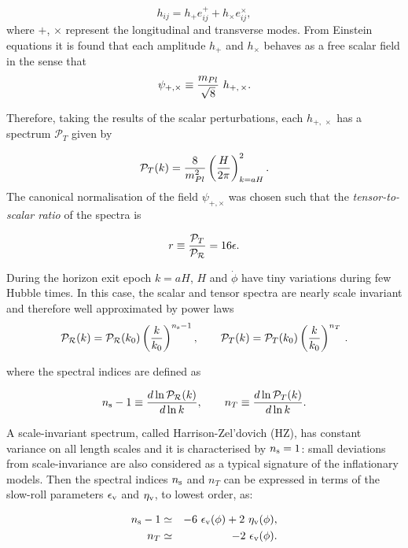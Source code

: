 \documentclass{rmaa}
\def\beq{\begin{equation}}
\def\eeq{\end{equation}}
\def\bea{\begin{eqnarray}}
\def\eea{\end{eqnarray}}
\def\cal{\mathcal}
\begin{document}
\beq
h_{ij}= h_{+}\mathit{e}^{+}_{ij}+h_{\times}\mathit{e}^{\times}_{ij},
\eeq
%
where $+$, $\times$ represent the longitudinal and transverse modes.
From Einstein equations it is found that each amplitude $h_{+}$ and $h_{\times}$
behaves as a free scalar field in the sense that
\beq
\psi_{+,\times}\equiv {m_{Pl} \over \sqrt 8}\,\,h_{+,\, \times}.
\eeq 

\noindent
Therefore, taking the results of the scalar perturbations, each $h_{+,\, \times}$ has a spectrum $\cal P_T$ given by

\beq
\cal P_{T}(k)={8 \over m_{Pl}^2} \left({H \over 2\pi} \right)_{k=aH}^2.
\eeq
%
The canonical normalisation of the field $\psi_{+,\times}$ was chosen such that
the \textit{tensor-to-scalar ratio} of the spectra is  

\begin{equation}
r \equiv {\cal P_{T} \over \cal P_{\cal R}} =16 \epsilon .
\end{equation}

During the horizon exit epoch $k=aH$, $H$ and $\dot \phi$ have
tiny variations during few Hubble times. In this case, the scalar and tensor 
spectra are nearly scale invariant and therefore well approximated by power laws 
%
\bea
\cal P_\cal R(k)  =\cal P_\cal R(k_0) \left( \frac{k}{k_0} \right)^{n_{\rm s}-1},\qquad %
\cal P_T(k)  = \cal P_T(k_0) \left( \frac{k}{k_0} \right)^{n_T} \, .
\eea

\noindent
where the spectral indices are defined as 

\beq
n_{\rm s}-1\equiv {d\ln \cal P_\cal R(k) \over d\ln k},\qquad
n_T \equiv {d\ln \cal P_T(k) \over d\ln k}. 
\eeq

\noindent
A scale-invariant spectrum, called Harrison-Zel'dovich (HZ), has constant variance
on all length scales and it is characterised by $n_{\rm s}= 1$:
small deviations from scale-invariance are also considered as a typical signature of the
inflationary models. 
Then the spectral indices $n_{\rm s}$ and $n_{T}$ can be expressed 
 in terms of the slow-roll parameters $\epsilon_{\rm v}$ and $\eta_{\rm v}$, to lowest order, as:

\bea \label{indices}
n_{\rm s} - 1  &\simeq&  - 6~ \epsilon_{\rm v}(\phi) + 2~ \eta_{\rm v}(\phi), \nonumber \\
n_T  &\simeq&  -2~ \epsilon_{\rm v}(\phi). 
\eea
\end{document}
